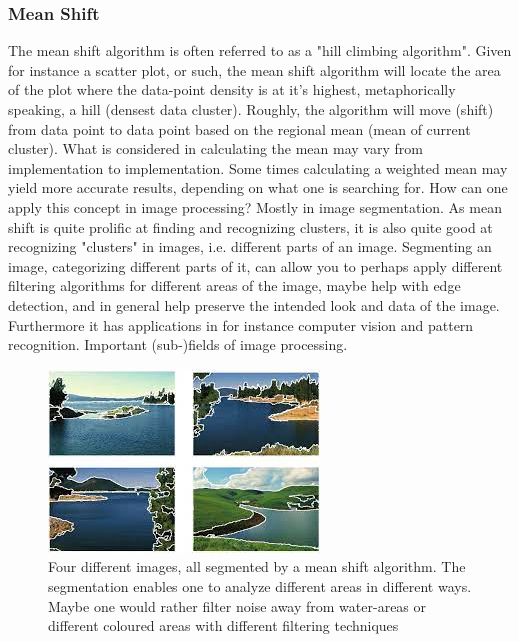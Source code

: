 \documentclass[twoside,a4paper,article]{combine}
\begin{document}
\subsubsection{Mean Shift}
The mean shift algorithm is often referred to as a "hill climbing algorithm". Given for instance a scatter plot, or such, the mean shift algorithm will locate the area of the plot where the data-point density is at it's highest, metaphorically speaking, a hill (densest data cluster). Roughly, the algorithm will move (shift) from data point to data point based on the regional mean (mean of current cluster). What is considered in calculating the mean may vary from implementation to implementation. Some times calculating a weighted mean may yield more accurate results, depending on what one is searching for.
How can one apply this concept in image processing? Mostly in image segmentation. As mean shift is quite prolific at finding and recognizing clusters, it is also quite good at recognizing "clusters" in images, i.e. different parts of an image. Segmenting an image, categorizing different parts of it, can allow you to perhaps apply different filtering algorithms for different areas of the image, maybe help with edge detection, and in general help preserve the intended look and data of the image. Furthermore it has applications in for instance computer vision and pattern recognition. Important (sub-)fields of image processing.
\begin{figure}[H]
    \centering
    \includegraphics[width=0.5\linewidth]{meanshift.jpeg}
    \caption{Four different images, all segmented by a mean shift algorithm. The segmentation enables one to analyze different areas in different ways. Maybe one would rather filter noise away from water-areas or different coloured areas with different filtering techniques}
    \label{fig:enter-label}
\end{figure}
\end{document}
